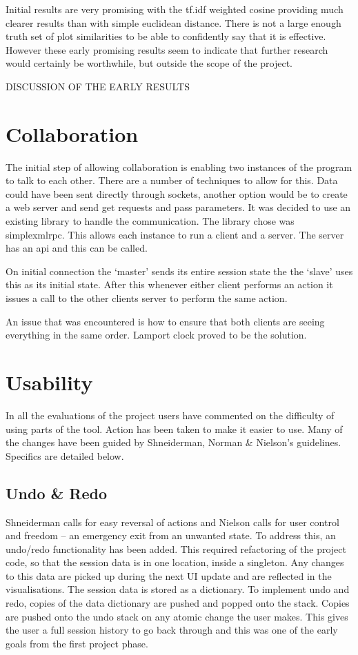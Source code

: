 Initial results are very promising with the tf.idf weighted cosine providing much clearer results than with simple euclidean distance.  There is not a large enough truth set of plot similarities to be able to confidently say that it is effective.  However these early promising results seem to indicate that further research would certainly be worthwhile, but outside the scope of the project.

DISCUSSION OF THE EARLY RESULTS

\section{Collaboration}

The initial step of allowing collaboration is enabling two instances of the program to talk to each other.  There are a number of techniques to allow for this.  Data could have been sent directly through sockets, another option would be to create a web server and send get requests and pass parameters.  It was decided to use an existing library to handle the communication.  The library chose was simplexmlrpc.  This allows each instance to run a client and a server.  The server has an api and this can be called.

On initial connection the `master' sends its entire session state the the `slave' uses this as its initial state.  After this whenever either client performs an action it issues a call to the other clients server to perform the same action.

An issue that was encountered is how to ensure that both clients are seeing everything in the same order.  Lamport clock proved to be the solution.

\section{Usability}

In all the evaluations of the project users have commented on the difficulty of using parts of the tool.  Action has been taken to make it easier to use.  Many of the changes have been guided by Shneiderman, Norman \& Nielson's guidelines.  Specifics are detailed below.

\subsection{Undo \& Redo}
Shneiderman calls for easy reversal of actions and Nielson calls for user control and freedom -- an emergency exit from an unwanted state.  To address this, an undo/redo functionality has been added.  This required refactoring of the project code, so that the session data is in one location, inside a singleton. Any changes to this data are picked up during the next \ac{UI} update and are reflected in the visualisations.  The session data is stored as a dictionary.  To implement undo and redo, copies of the data dictionary are pushed and popped onto the stack.  Copies are pushed onto the undo stack on any atomic change the user makes.  This gives the user a full session history to go back through and this was one of the early goals from the first project phase.

